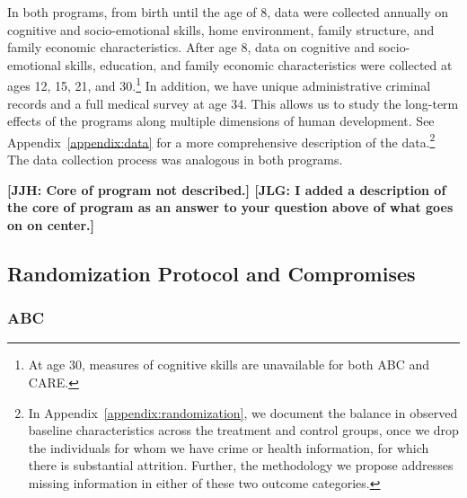 In both programs, from birth until the age of 8, data were collected annually on cognitive and socio-emotional skills, home environment, family structure, and family economic characteristics. After age 8, data on cognitive and socio-emotional skills, education, and family economic characteristics were collected at ages 12, 15, 21, and 30.\footnote{At age 30, measures of cognitive skills are unavailable for both ABC and CARE.} In addition, we have unique administrative criminal records and a full medical survey at age 34. This allows us to study the long-term effects of the programs along multiple dimensions of human development. See Appendix~\ref{appendix:data} for a more comprehensive description of the data.\footnote{In Appendix~\ref{appendix:randomization}, we document the balance in observed baseline characteristics across the treatment and control groups, once we drop the individuals for whom we have crime or health information, for which there is substantial attrition. Further, the methodology we propose addresses missing information in either of these two outcome categories.} The data collection process was analogous in both programs.

\textbf{[JJH: Core of program not described.] [JLG: I added a description of the core of program as an answer to your question above of what goes on on center.]}

\subsection{Randomization Protocol and Compromises} \label{section:randomization}

\subsubsection{ABC}

